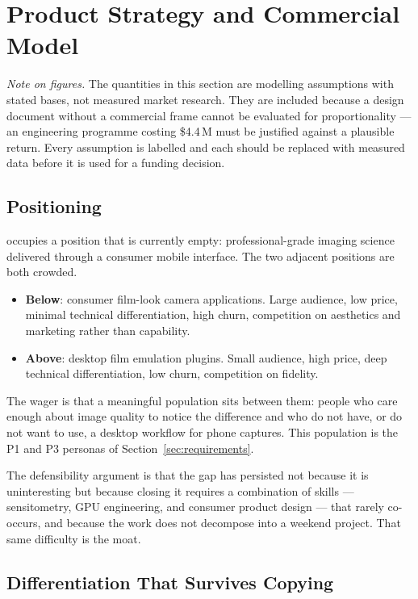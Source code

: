\section{Product Strategy and Commercial Model}
\label{sec:business}

\noindent\emph{Note on figures.} The quantities in this section are modelling
assumptions with stated bases, not measured market research. They are included
because a design document without a commercial frame cannot be evaluated for
proportionality --- an engineering programme costing \$4.4\,M must be justified
against a plausible return. Every assumption is labelled and each should be
replaced with measured data before it is used for a funding decision.

\subsection{Positioning}

\EM{} occupies a position that is currently empty: professional-grade imaging
science delivered through a consumer mobile interface. The two adjacent
positions are both crowded.

\begin{itemize}
\item \textbf{Below}: consumer film-look camera applications. Large audience,
low price, minimal technical differentiation, high churn, competition on
aesthetics and marketing rather than capability.
\item \textbf{Above}: desktop film emulation plugins. Small audience, high
price, deep technical differentiation, low churn, competition on fidelity.
\end{itemize}

The wager is that a meaningful population sits between them: people who care
enough about image quality to notice the difference and who do not have, or do
not want to use, a desktop workflow for phone captures. This population is the
P1 and P3 personas of Section~\ref{sec:requirements}.

The defensibility argument is that the gap has persisted not because it is
uninteresting but because closing it requires a combination of skills ---
sensitometry, GPU engineering, and consumer product design --- that rarely
co-occurs, and because the work does not decompose into a weekend project. That
same difficulty is the moat.

\subsection{Differentiation That Survives Copying}

